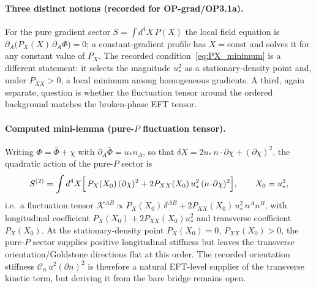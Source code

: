 

\paragraph{Three distinct notions (recorded for OP-grad/OP3.1a).}
For the pure gradient sector $S=\int d^4X\,P(X)$ the local field
equation is $\partial_A\bigl(P_X(X)\,\partial_A\Phi\bigr)=0$; a
constant-gradient profile has $X=\mathrm{const}$ and solves it for
any constant value of $P_X$.
The recorded condition~\eqref{eq:PX_minimum} is a different
statement: it selects the magnitude $u_*^2$ as a stationary-density point
and, under $P_{XX}>0$, a local minimum among homogeneous
gradients.
A third, again separate, question is whether the fluctuation
tensor around the ordered background matches the broken-phase EFT
tensor.

\paragraph{Computed mini-lemma (pure-$P$ fluctuation tensor).}
Writing $\Phi=\bar\Phi+\chi$ with $\partial_A\bar\Phi=u_*n_A$, so
that $\delta X=2u_*\,n\!\cdot\!\partial\chi+(\partial\chi)^2$, the
quadratic action of the pure-$P$ sector is
\[
S^{(2)}=\int d^4X\Bigl[\,P_X(X_0)\,(\partial\chi)^2
+2P_{XX}(X_0)\,u_*^2\,(n\!\cdot\!\partial\chi)^2\Bigr],
\qquad X_0=u_*^2 ,
\]
i.e.\ a fluctuation tensor
$\mathcal K^{AB}\propto P_X(X_0)\,\delta^{AB}
+2P_{XX}(X_0)\,u_*^2\,n^An^B$, with longitudinal coefficient
$P_X(X_0)+2P_{XX}(X_0)u_*^2$ and transverse coefficient
$P_X(X_0)$.
At the stationary-density point $P_X(X_0)=0$, $P_{XX}(X_0)>0$, the
pure-$P$
sector supplies positive longitudinal stiffness but leaves the
transverse orientation/Goldstone directions flat at this order.
The recorded orientation stiffness
$\mathcal C_n\,u^2(\partial n)^2$ is therefore a natural EFT-level
supplier of the transverse kinetic term, but deriving it from the
bare bridge remains open.

